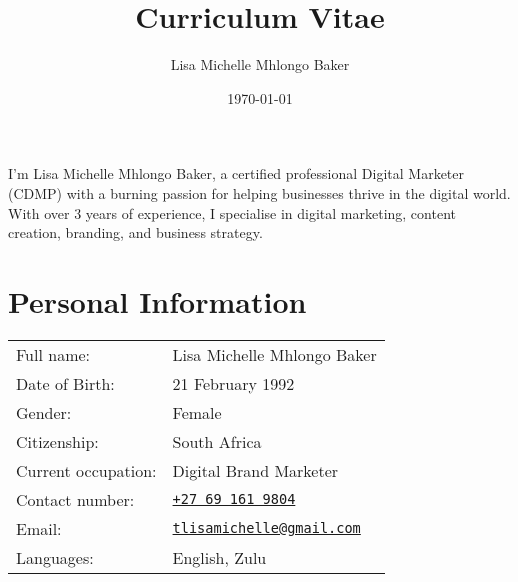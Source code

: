 \documentclass{article}
\author{Lisa Michelle Mhlongo Baker}
\title{Curriculum Vitae}
\date{\today}
\newcommand{\email}[1]{\href{mailto:#1}{\texttt{#1}}}
\newcommand{\tel}[2]{\href{tel:#1}{\texttt{#2}}}
\begin{document}
 \maketitle


\begin{center}
  \begin{minipage}{0.78\textwidth}
    I'm Lisa Michelle Mhlongo Baker, a certified professional Digital Marketer (CDMP) with a burning passion for helping businesses thrive in the digital world.
    With over 3 years of experience, I specialise in digital marketing, content creation, branding, and business strategy.
  \end{minipage}
\end{center}


\section*{Personal Information}
\begin{center} \begin{tabular}{ll}
	Full name: 								& Lisa Michelle Mhlongo Baker \\
	Date of Birth:						& 21 February 1992 \\
	Gender: 									& Female \\
	Citizenship:							& South Africa \\
	Current occupation:				& Digital Brand Marketer \\
	Contact number:	  				& \tel{+27691619804}{+27 69 161 9804} \\
	Email:										& \email{tlisamichelle@gmail.com} \\
	Languages:								& English, Zulu \\
\end{tabular} \end{center}
\end{document}
